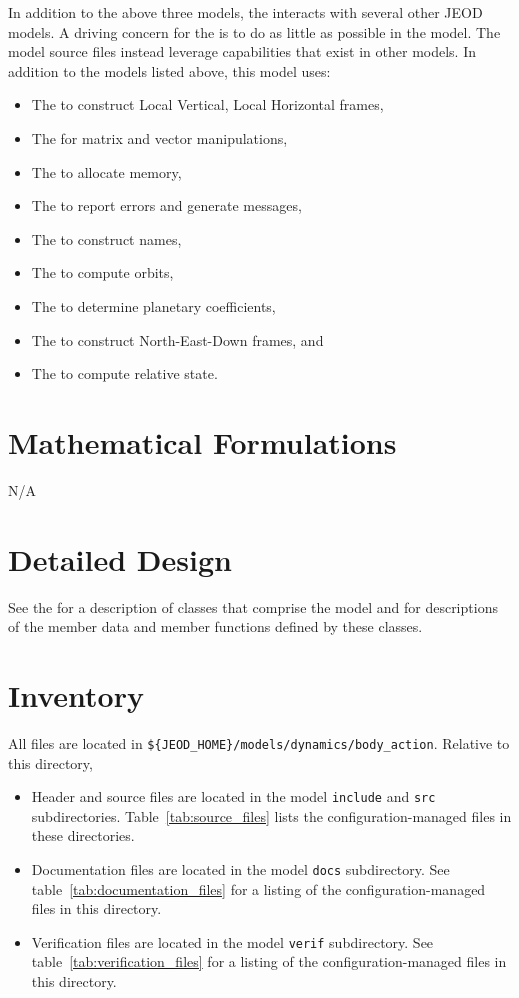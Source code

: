 In addition to the above three models, the \ModelDesc interacts with
several other JEOD models. A driving concern for the \ModelDesc is to
do as little as possible in the model.
The model source files instead leverage capabilities that exist in other
models. In addition to the models listed above, this model uses:
\begin{itemize}
\item The 
to construct Local Vertical, Local Horizontal frames,
\item The 
for matrix and vector manipulations,
\item The 
to allocate memory,
\item The 
to report errors and generate messages,
\item The 
to construct names,
\item The 
to compute orbits,
\item The 
to determine planetary coefficients,
\item The 
to construct North-East-Down frames, and
\item The 
to compute relative state.
\end{itemize}


\section{Mathematical Formulations}
N/A
\section{Detailed Design}
See the 
for a description of classes that comprise the model and for descriptions
of the member data and member functions defined by these classes.

\section{Inventory}
All \ModelDesc files are located in
{\tt \$\{JEOD\_HOME\}/models/dynamics/body\_action}.
Relative to this directory,
\begin{itemize}
\vspace{-0.2\baselineskip}
\item Header and source files are located
in the model {\tt include} and {\tt src} subdirectories.
Table~\ref{tab:source_files} lists the
configuration-managed files in these directories.
\vspace{-0.1\baselineskip}
\item Documentation files are located in the model {\tt docs} subdirectory.
See table~\ref{tab:documentation_files}
for a listing of the
configuration-managed files in this directory.
\vspace{-0.1\baselineskip}
\item Verification files are located in the model {\tt verif} subdirectory.
See table~\ref{tab:verification_files}
for a listing of the
configuration-managed files in this directory.
\end{itemize}


